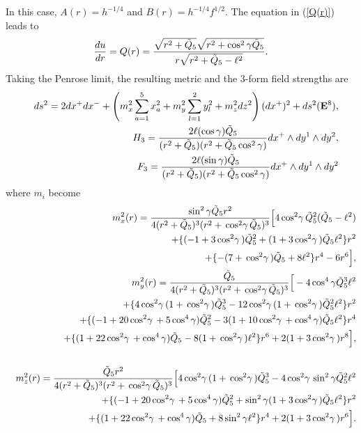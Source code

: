 \documentclass[a4paper,12pt]{article}
\begin{document}
In this case, $A(r)=h^{-1/4}$ and $B(r)=h^{-1/4}f^{1/2}$.
The equation in (\ref{Q(r)}) leads to
\begin{eqnarray}
{du\over dr}=Q(r)
={\sqrt{r^2+\tilde{Q}_5}\sqrt{r^2+\cos^2\gamma \tilde{Q}_5}\over
r \sqrt{r^2+\tilde{Q}_5-\ell^2}}. 
\label{Q(p,q)5} 
\end{eqnarray}
Taking the Penrose limit, the resulting metric and 
the $3$-form field strengths are
\begin{eqnarray}
&&ds^2=2dx^+dx^-+\left(
m_x^2\sum_{a=1}^{5}x_a^2 +m_y^2\sum_{l=1}^{2}y_{l}^2
+m_z^2dz^2
\right)(dx^+)^2
+ds^2({\bf E}^{8}),\nonumber \\
&&
H_{3}= \frac{2\ell(\cos\gamma) \tilde{Q}_5 }
{(r^2+\tilde{Q}_5)(r^2+\tilde{Q}_5\cos^2\gamma)}
dx^+\wedge dy^1\wedge dy^2, \nonumber \\
&&
F_{3}= \frac{2\ell(\sin\gamma) \tilde{Q}_5}
{(r^2+\tilde{Q}_5)(r^2+\tilde{Q}_5\cos^2\gamma)}
dx^+\wedge dy^1\wedge dy^2
\end{eqnarray}
where $m_i$ become
\begin{eqnarray}
&&m^2_x(r)= {\sin^2\gamma \tilde{Q}_{5} r^2\over 4 (r^2+\tilde{Q}_{5})^3
(r^2+{\,\cos^2\!\gamma\,}\tilde{Q}_{5})^3}\Big[ 4{\,\cos^2\!\gamma\,}\tilde{Q}_{5}^2 (\tilde{Q}_{5} -\ell^2)  
\nonumber \\
&&\quad\quad\quad\quad
+\{(-1+ 3{\,\cos^2\!\gamma\,} )\tilde{Q}_{5}^2+(1+3{\,\cos^2\!\gamma\,})\tilde{Q}_{5}\ell^2 \}r^2
\nonumber \\
&&\quad\quad\quad\quad
+\{-(7+{\,\cos^2\!\gamma\,})\tilde{Q}_{5}+8\ell^2 \}r^4 -6 r^6\Big],
\label{pq5mx} \\
&&m^2_y(r)={\tilde{Q}_{5}\over 4 (r^2+\tilde{Q}_{5})^3
(r^2+{\,\cos^2\!\gamma\,}\tilde{Q}_{5})^3}\Big[ -4\cos^4\gamma\tilde{Q}_{5}^3 \ell^2\nonumber\\
&&
\quad\quad\quad\quad+ \{ 4{\,\cos^2\!\gamma\,} (1+{\,\cos^2\!\gamma\,})\tilde{Q}_{5}^3 -12{\,\cos^2\!\gamma\,}(1+{\,\cos^2\!\gamma\,})
 \tilde{Q}_{5}^2\ell^2\}r^2
\nonumber\\
&&\quad\quad\quad\quad
+ \{(-1+20{\,\cos^2\!\gamma\,} +5\cos^4\gamma)\tilde{Q}_{5}^2  -3(1+10{\,\cos^2\!\gamma\,} +\cos^4\gamma)\tilde{Q}_{5}\ell^2
\}r^4\nonumber\\
&&\quad\quad\quad\quad
+ \{ (1+22{\,\cos^2\!\gamma\,} +\cos^4\gamma)\tilde{Q}_{5}  -8(1+{\,\cos^2\!\gamma\,})\ell^2
\}r^6
+ 2(1+3{\,\cos^2\!\gamma\,})r^8\Big],
\nonumber \\
\label{pq5my}\\
&&m^2_z(r)={\tilde{Q}_{5} r^2\over 4 (r^2+\tilde{Q}_{5})^3
(r^2+{\,\cos^2\!\gamma\,}\tilde{Q}_{5})^3}
\Big[ 
 4{\,\cos^2\!\gamma\,} (1+{\,\cos^2\!\gamma\,})\tilde{Q}_{5}^3 
-4 {\,\cos^2\!\gamma\,}\sin^{2}\gamma\tilde{Q}_{5}^2\ell^2 
\nonumber \\
&&\quad\quad\quad\quad
+ \{(-1+20{\,\cos^2\!\gamma\,} +5\cos^4\gamma)\tilde{Q}_{5}^2
  +\sin^{2}\gamma(1+3{\,\cos^2\!\gamma\,})\tilde{Q}_{5}\ell^2
 \}r^2\nonumber\\
&&\quad\quad\quad\quad
+ \{ (1+22{\,\cos^2\!\gamma\,} +\cos^4\gamma)\tilde{Q}_{5}
  +8\sin^{2}\gamma\ell^2
\}r^4
+ 2(1+3{\,\cos^2\!\gamma\,})r^6\Big].
\label{pq5mz}
\end{eqnarray}
\end{document}
